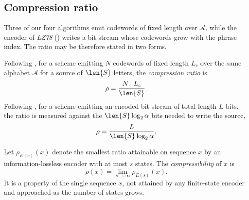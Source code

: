 \subsection{Compression ratio}

Three of our four algorithms emit codewords of fixed length over \(\mathcal{A}\), while the encoder of \emph{LZ78} (\cite{ziv1978}) writes a bit stream whose codewords grow with the phrase index. The ratio may be therefore stated in two forms.
\begin{definition}
\label{def:compression-ratio}
    Following \cite{ziv1977}, for a scheme emitting \(N\) codewords of fixed length \(L_c\) over the same alphabet \(\mathcal{A}\) for a source of \(\len{S}\) letters, the \emph{compression ratio} is
    \[
      \rho = \frac{N \cdot L_c}{\len{S}} .
    \]
    Following \cite{ziv1978}, for a scheme emitting an encoded bit stream of total length \(L\) bits, the ratio is measured against the \(\len{S} \log_2 \alpha\) bits needed to write the source,
    \[
      \rho = \frac{L}{\len{S} \log_2 \alpha} .
    \]
\end{definition}

\begin{definition}
\label{def:compressibility}
    Let \(\rho_{E(s)}(x)\) denote the smallest ratio attainable on sequence \(x\) by an information-lossless encoder with at most \(s\) states. The \emph{compressibility} of \(x\) is
    \[
        \rho(x) = \lim_{s \to \infty} \rho_{E(s)}(x) .
    \]
    It is a property of the single sequence \(x\), not attained by any finite-state encoder and approached as the number of states grows.
\end{definition}